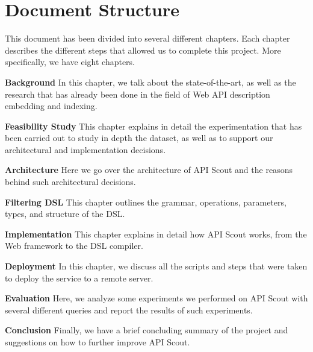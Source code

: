 \section{Document Structure}\label{sec:document-structure}
This document has been divided into several different chapters.
Each chapter describes the different steps that allowed us to complete this project.
More specifically, we have eight chapters.

\begin{description}
    \item \textbf{Background} In this chapter, we talk about the state-of-the-art, as well as the research that has already been done in the field of Web API description embedding and indexing.
    \item \textbf{Feasibility Study} This chapter explains in detail the experimentation that has been carried out to study in depth the dataset,
    as well as to support our architectural and implementation decisions.
    \item \textbf{Architecture} Here we go over the architecture of API Scout and the reasons behind such architectural decisions.
    \item \textbf{Filtering DSL} This chapter outlines the grammar, operations, parameters, types, and structure of the DSL\@.
    \item \textbf{Implementation} This chapter explains in detail how API Scout works, from the Web framework to the DSL compiler.
    \item \textbf{Deployment} In this chapter, we discuss all the scripts and steps that were taken to deploy the service to a remote server.
    \item \textbf{Evaluation} Here, we analyze some experiments we performed on API Scout with several different queries and report the results of such experiments.
    \item \textbf{Conclusion} Finally, we have a brief concluding summary of the project and suggestions on how to further improve API Scout.
\end{description}
